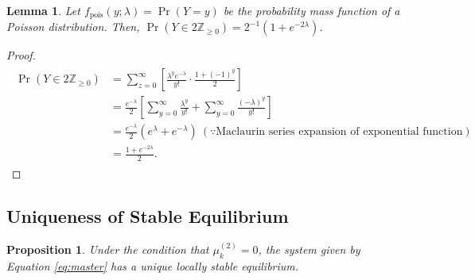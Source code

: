 \documentclass[11pt, class=article, crop=false]{standalone}
\newtheorem{proposition}{Proposition}[subsection]
\newtheorem{lemma}{Lemma}[subsection]
\theoremstyle{definition}
\begin{document}
\begin{lemma}
\label{lemma-pois}
Let $f_{\text{pois}}(y; \lambda) = \Pr(Y = y)$ be the probability mass function of a Poisson distribution.
Then, $\Pr(Y \in 2\mathbb{Z}_{\ge 0}) = 2^{-1}(1 + e^{- 2 \lambda})$.
\end{lemma}
\begin{proof}
\begin{align}
    \begin{split}
        \Pr(Y \in 2\mathbb{Z}_{\ge 0}) 
        &= \sum_{z = 0}^{\infty} \left[ \frac{\lambda^{y} e^{-\lambda}}{y!} \cdot \frac{1 + (-1)^{y}}{2} \right]\\
        &= \frac{e^{-\lambda}}{2} \left[ \sum_{y = 0}^{\infty} \frac{\lambda^{y}}{y!} + \sum_{y = 0}^{\infty} \frac{(-\lambda)^{y}}{y!}\right]\\
        &= \frac{e^{-\lambda}}{2} (e^{\lambda} + e^{-\lambda}) ~ (\because \text{Maclaurin series expansion of exponential function})\\
        &= \frac{1 + e^{- 2 \lambda}}{2}.
    \end{split}
\end{align}
\end{proof}

\newpage

\subsection{Uniqueness of Stable Equilibrium}
 
\begin{proposition}
Under the condition that $\mu_k^{(2)} = 0$, the system given by Equation \ref{eq:master} has a unique locally stable equilibrium.
\end{proposition}
\end{document}
